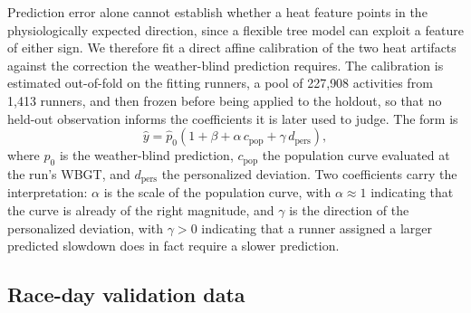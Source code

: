 \documentclass[11pt]{article}
\renewcommand{\_}{\textunderscore\allowbreak}
\begin{document}
Prediction error alone cannot establish whether a heat feature points in the physiologically expected direction, since a flexible tree model can exploit a feature of either sign. We therefore fit a direct affine calibration of the two heat artifacts against the correction the weather-blind prediction requires. The calibration is estimated out-of-fold on the fitting runners, a pool of 227{,}908 activities from 1{,}413 runners, and then frozen before being applied to the holdout, so that no held-out observation informs the coefficients it is later used to judge. The form is
\begin{equation}
  \hat{y} = \hat{p}_0\left(1 + \beta + \alpha\,c_{\mathrm{pop}} + \gamma\,d_{\mathrm{pers}}\right),
\end{equation}
where $\hat{p}_0$ is the weather-blind prediction, $c_{\mathrm{pop}}$ the population curve evaluated at the run's WBGT, and $d_{\mathrm{pers}}$ the personalized deviation. Two coefficients carry the interpretation: $\alpha$ is the scale of the population curve, with $\alpha \approx 1$ indicating that the curve is already of the right magnitude, and $\gamma$ is the direction of the personalized deviation, with $\gamma > 0$ indicating that a runner assigned a larger predicted slowdown does in fact require a slower prediction.

\subsection{Race-day validation data}
\label{sec:raceday_methods}
\end{document}
